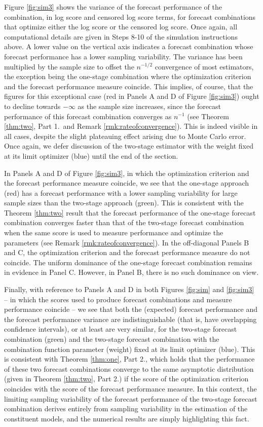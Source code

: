 \documentclass[12pt]{article}
\theoremstyle{definition}
\theoremstyle{remark}
\begin{document}
Figure \ref{fig:sim3} shows the variance of the forecast performance of the combination, in log score and censored log score terms, for forecast combinations that optimize either the log score or the censored log score. Once again, all computational details are given in Steps 8-10 of the simulation instructions above. A lower value on the vertical axis indicates a forecast combination whose forecast performance has a lower sampling variability. The variance has been multiplied by the sample size to offset the $n^{-1/2}$ convergence of most estimators, the exception being the one-stage combination where the optimization criterion and the forecast performance measure coincide. This implies, of course, that the figures for this exceptional case (red in Panels A and D of Figure \ref{fig:sim3}) ought to decline towards $-\infty$ as the sample size increases, since the forecast performance of this forecast combination converges as $n^{-1}$ (see Theorem \ref{thm:two}, Part 1.\ and Remark \ref{rmk:rateofconvergence}). This is indeed visible in all cases, despite the slight plateauing effect arising due to Monte Carlo error. Once again, we defer discussion of the two-stage estimator with the weight fixed at its limit optimizer (blue) until the end of the section.

In Panels A and D of Figure \ref{fig:sim3}, in which the optimization criterion and the forecast performance measure coincide, we see that the one-stage approach (red) has a forecast performance with a lower sampling variability for large sample sizes than the two-stage approach (green). This is consistent with the Theorem \ref{thm:two} result that the forecast performance of the one-stage forecast combination converges faster than that of the two-stage forecast combination when the same score is used to measure performance and optimize the parameters (see Remark \ref{rmk:rateofconvergence}). In the off-diagonal Panels B and C, the optimization criterion and the forecast performance measure do not coincide. The uniform dominance of the one-stage forecast combination remains in evidence in Panel C. However, in Panel B, there is no such dominance on view.

Finally, with reference to Panels A and D in both Figures \ref{fig:sim} and \ref{fig:sim3} -- in which the scores used to produce forecast combinations and measure performance coincide -- we see that both the (expected) forecast performance and the forecast performance variance are indistinguishable (that is, have overlapping confidence intervals), or at least are very similar, for the two-stage forecast combination (green) and the two-stage forecast combination with the combination function parameter (weight) fixed at its limit optimizer (blue). This is consistent with Theorem \ref{thm:one}, Part 2., which holds that the performance of these two forecast combinations converge to the same asymptotic distribution (given in Theorem \ref{thm:two}, Part 2.) if the score of the optimization criterion coincides with the score of the forecast performance measure. In this context, the limiting sampling variability of the forecast performance of the two-stage forecast combination derives entirely from sampling variability in the estimation of the constituent models, and the numerical results are simply highlighting this fact.
\end{document}
